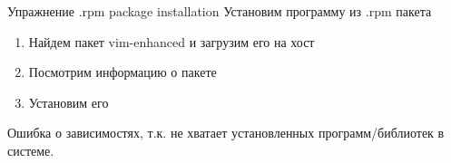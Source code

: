 \begin{frame}{ Упражнение .rpm package installation}
    Установим программу из .rpm пакета
    \begin{enumerate}
        \item Найдем пакет vim-enhanced и загрузим его на хост 
        \pause
        \item Посмотрим информацию о пакете
        \pause
        \item Установим его
        \pause
    \end{enumerate}
    Ошибка о зависимостях, т.к. не хватает установленных программ/библиотек в системе.
\end{frame}
